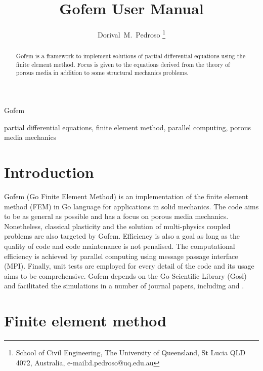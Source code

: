 \documentclass[twoside,journal]{IEEEtran}
\begin{document}
\title{Gofem User Manual}

\author{Dorival~M.~Pedroso%
\thanks{School of Civil Engineering, The University of Queensland, St Lucia QLD 4072, Australia,
e-mail:d.pedroso@uq.edu.au}}

{Gofem}

\maketitle




\begin{abstract}

Gofem is a framework to implement solutions of partial differential equations using the finite
element method. Focus is given to the equations derived from the theory of porous media in addition
to some structural mechanics problems.

\end{abstract}

\begin{IEEEkeywords}
partial differential equations, finite element method, parallel computing, porous media mechanics
\end{IEEEkeywords}



\section{Introduction}
\label{sec:intro}

Gofem (Go Finite Element Method) is an implementation of the finite element method (FEM) in Go
language for applications in solid mechanics. The code aims to be as general as possible and has a
focus on porous media mechanics. Nonetheless, classical plasticity and the solution of multi-physics
coupled problems are also targeted by Gofem. Efficiency is also a goal as long as the quality of
code and code maintenance is not penalised. The computational efficiency is achieved by parallel
computing using message passage interface (MPI). Finally, unit tests are employed for every detail
of the code and its usage aims to be comprehensive. Gofem depends on the Go Scientific Library
(Gosl) and facilitated the simulations in a number of journal papers, including \cite{pedroso:15a}
and \cite{pedroso:15b}.



\section{Finite element method}
\end{document}
